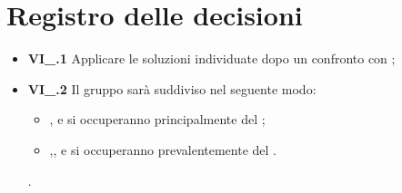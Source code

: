 \section{Registro delle decisioni}
\begin{itemize}
	\item \textbf{VI\_\Data.1} Applicare le soluzioni individuate dopo un confronto con {\Proponente};
	\item \textbf{VI\_\Data.2} Il gruppo sarà suddiviso nel seguente modo:
	\begin{itemize}
		\item {\TL},{\BL} e {\FF} si occuperanno principalmente del ;
		\item {\MM},{\PC},{\TG} e {\VD} si occuperanno prevalentemente del .
	\end{itemize}.
\end{itemize}